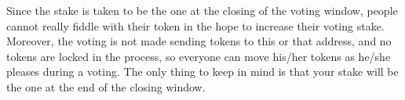 \documentclass[submission, copyright,creativecommons,sharealike,noncommercial]{eptcs}
\begin{document}
		Since the stake is taken to be the one at the closing of the voting window, people cannot really fiddle with their token in the hope to increase their voting stake. Moreover, the voting is not made sending tokens to this or that address, and no tokens are locked in the process, so everyone can move his/her tokens as he/she pleases during a voting. The only thing to keep in mind is that your stake will be the one at the end of the closing window.
		
		
\end{document}
